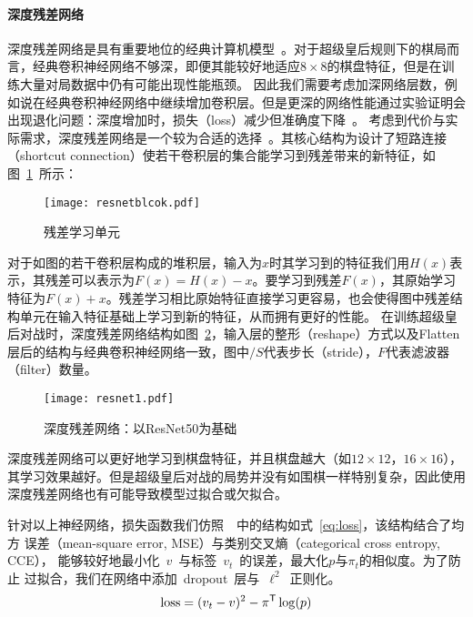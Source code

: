 \paragraph{深度残差网络}
深度残差网络是具有重要地位的经典计算机模型~\cite{resnet}。对于超级皇后规则下的棋局而言，经典卷积神经网络不够深，即便其能较好地适应$8\times8$的棋盘特征，但是在训练大量对局数据中仍有可能出现性能瓶颈。
因此我们需要考虑加深网络层数，例如说在经典卷积神经网络中继续增加卷积层。但是更深的网络性能通过实验证明会出现退化问题：深度增加时，损失（loss）减少但准确度下降~\cite{resnet,he2016identity}。
考虑到代价与实际需求，深度残差网络是一个较为合适的选择~\cite{resnet}。其核心结构为设计了短路连接（shortcut connection）使若干卷积层的集合能学习到残差带来的新特征，如图~\ref{fig:resunit}~所示：
\begin{figure}[H]
    \centering
    \texttt{[image: resnetblcok.pdf]}
    \caption[resunit]{%
    残差学习单元~\cite{resnet}%
      }
    \label{fig:resunit}
\end{figure}
对于如图的若干卷积层构成的堆积层，输入为$x$时其学习到的特征我们用$H(x)$表示，其残差可以表示为$F(x)=H(x)-x$。要学习到残差$F(x)$，其原始学习特征为$F(x)+x$。残差学习相比原始特征直接学习更容易，也会使得图中残差结构单元在输入特征基础上学习到新的特征，从而拥有更好的性能。
在训练超级皇后对战时，深度残差网络结构如图~\ref{fig:res}，输入层的整形（reshape）方式以及Flatten层后的结构与经典卷积神经网络一致，图中$/S$代表步长（stride），$F$代表滤波器（filter）数量。
\begin{figure}[!t]
    \centering
    \texttt{[image: resnet1.pdf]}
    \caption[res]{%
    深度残差网络：以ResNet50为基础~\cite{resnet}%
      }
    \label{fig:res}
\end{figure}
深度残差网络可以更好地学习到棋盘特征，并且棋盘越大（如$12\times12$，$16\times16$），其学习效果越好。但是超级皇后对战的局势并没有如围棋一样特别复杂，因此使用深度残差网络也有可能导致模型过拟合或欠拟合。

针对以上神经网络，损失函数我们仿照~\cite{Silver2017}~中的结构如式~\eqref{eq:loss}，该结构结合了均方
误差（mean-square error, MSE）与类别交叉熵（categorical cross entropy, CCE），
能够较好地最小化~$v$~与标签~$v_{t}$~的误差，最大化$p$与$\pi_{t}$的相似度。为了防止
过拟合，我们在网络中添加~dropout~层与~$\ell^2$~正则化。
\begin{equation}
    \text{loss} = (v_{t}-v)^{2} - \pi^{\mathsf T}\log(p)
    \label{eq:loss}
\end{equation}

